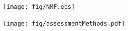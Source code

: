 
{
%
\frame[plain]{}
}

\appendix
{}
\setcounter{finalframe}{\value{framenumber}}


{\nologo
\begin{frame}
	\centering
	\texttt{[image: fig/NMF.eps]}
\end{frame}
\begin{frame}
	\centering
	\texttt{[image: fig/assessmentMethods.pdf]}
\end{frame}
}

\setcounter{framenumber}{\value{finalframe}}